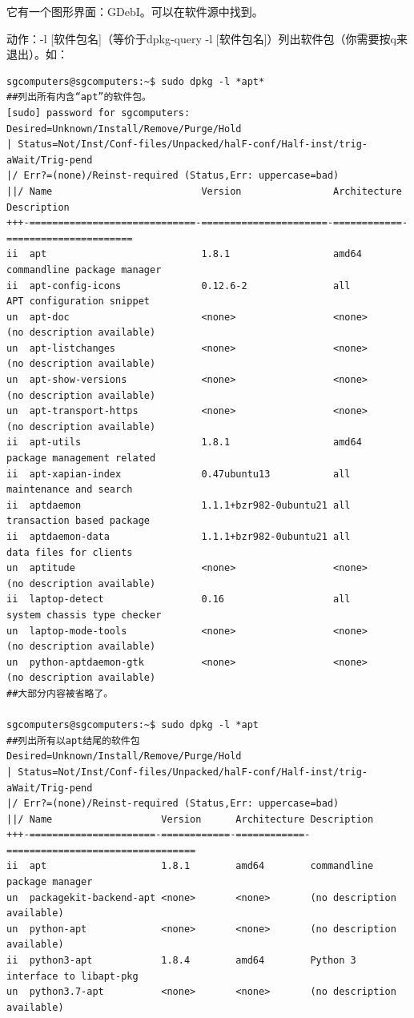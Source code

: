 \documentclass{book}
\begin{document}
它有一个图形界面：GDebI。可以在软件源中找到。\par
动作：-l [软件包名]（等价于dpkg-query -l [软件包名]）列出软件包（你需要按q来退出）。如：
\begin{verbatim}
sgcomputers@sgcomputers:~$ sudo dpkg -l *apt*
##列出所有内含“apt”的软件包。
[sudo] password for sgcomputers: 
Desired=Unknown/Install/Remove/Purge/Hold
| Status=Not/Inst/Conf-files/Unpacked/halF-conf/Half-inst/trig-aWait/Trig-pend
|/ Err?=(none)/Reinst-required (Status,Err: uppercase=bad)
||/ Name                          Version                Architecture Description
+++-=============================-======================-============-======================
ii  apt                           1.8.1                  amd64        commandline package manager
ii  apt-config-icons              0.12.6-2               all          APT configuration snippet 
un  apt-doc                       <none>                 <none>       (no description available)
un  apt-listchanges               <none>                 <none>       (no description available)
un  apt-show-versions             <none>                 <none>       (no description available)
un  apt-transport-https           <none>                 <none>       (no description available)
ii  apt-utils                     1.8.1                  amd64        package management related 
ii  apt-xapian-index              0.47ubuntu13           all          maintenance and search 
ii  aptdaemon                     1.1.1+bzr982-0ubuntu21 all          transaction based package 
ii  aptdaemon-data                1.1.1+bzr982-0ubuntu21 all          data files for clients
un  aptitude                      <none>                 <none>       (no description available)
ii  laptop-detect                 0.16                   all          system chassis type checker
un  laptop-mode-tools             <none>                 <none>       (no description available)
un  python-aptdaemon-gtk          <none>                 <none>       (no description available)
##大部分内容被省略了。

sgcomputers@sgcomputers:~$ sudo dpkg -l *apt
##列出所有以apt结尾的软件包
Desired=Unknown/Install/Remove/Purge/Hold
| Status=Not/Inst/Conf-files/Unpacked/halF-conf/Half-inst/trig-aWait/Trig-pend
|/ Err?=(none)/Reinst-required (Status,Err: uppercase=bad)
||/ Name                   Version      Architecture Description
+++-======================-============-============-=================================
ii  apt                    1.8.1        amd64        commandline package manager
un  packagekit-backend-apt <none>       <none>       (no description available)
un  python-apt             <none>       <none>       (no description available)
ii  python3-apt            1.8.4        amd64        Python 3 interface to libapt-pkg
un  python3.7-apt          <none>       <none>       (no description available)


\end{verbatim}
\end{document}
